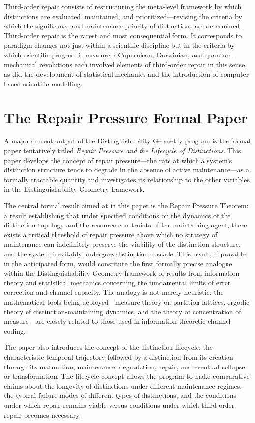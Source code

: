 \documentclass[11pt, oneside]{book}
\theoremstyle{definition}
\theoremstyle{remark}
\begin{document}
Third-order repair consists of restructuring the meta-level framework by which distinctions are evaluated, maintained, and prioritized—revising the criteria by which the significance and maintenance priority of distinctions are determined. Third-order repair is the rarest and most consequential form. It corresponds to paradigm changes not just within a scientific discipline but in the criteria by which scientific progress is measured: Copernican, Darwinian, and quantum-mechanical revolutions each involved elements of third-order repair in this sense, as did the development of statistical mechanics and the introduction of computer-based scientific modelling.

\section{The Repair Pressure Formal Paper}

A major current output of the Distinguishability Geometry program is the formal paper tentatively titled \textit{Repair Pressure and the Lifecycle of Distinctions}. This paper develops the concept of repair pressure—the rate at which a system's distinction structure tends to degrade in the absence of active maintenance—as a formally tractable quantity and investigates its relationship to the other variables in the Distinguishability Geometry framework.

The central formal result aimed at in this paper is the Repair Pressure Theorem: a result establishing that under specified conditions on the dynamics of the distinction topology and the resource constraints of the maintaining agent, there exists a critical threshold of repair pressure above which no strategy of maintenance can indefinitely preserve the viability of the distinction structure, and the system inevitably undergoes distinction cascade. This result, if provable in the anticipated form, would constitute the first formally precise analogue within the Distinguishability Geometry framework of results from information theory and statistical mechanics concerning the fundamental limits of error correction and channel capacity. The analogy is not merely heuristic: the mathematical tools being deployed—measure theory on partition lattices, ergodic theory of distinction-maintaining dynamics, and the theory of concentration of measure—are closely related to those used in information-theoretic channel coding.

The paper also introduces the concept of the distinction lifecycle: the characteristic temporal trajectory followed by a distinction from its creation through its maturation, maintenance, degradation, repair, and eventual collapse or transformation. The lifecycle concept allows the program to make comparative claims about the longevity of distinctions under different maintenance regimes, the typical failure modes of different types of distinctions, and the conditions under which repair remains viable versus conditions under which third-order repair becomes necessary.
\end{document}
